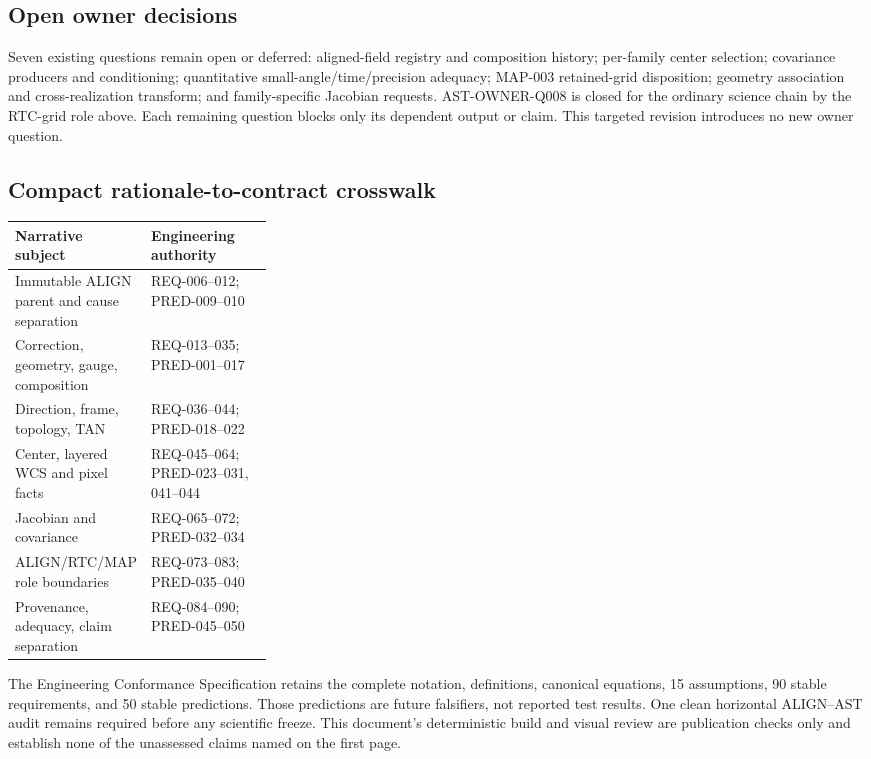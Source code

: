 \documentclass[10pt]{article}
\begin{document}
\subsection*{Open owner decisions}
Seven existing questions remain open or deferred: aligned-field registry and
composition history; per-family center selection; covariance producers and
conditioning; quantitative small-angle/time/precision adequacy; MAP-003
retained-grid disposition; geometry association and cross-realization
transform; and family-specific Jacobian requests. AST-OWNER-Q008 is closed for
the ordinary science chain by the RTC-grid role above. Each remaining question
blocks only its dependent output or claim. This
targeted revision introduces no new owner question.

\subsection*{Compact rationale-to-contract crosswalk}
\begin{tabularx}{\linewidth}{>{\raggedright\arraybackslash}p{0.30\linewidth}X}
\toprule
Narrative subject & Engineering authority \\
\midrule
Immutable ALIGN parent and cause separation & REQ-006--012; PRED-009--010 \\
Correction, geometry, gauge, composition & REQ-013--035; PRED-001--017 \\
Direction, frame, topology, TAN & REQ-036--044; PRED-018--022 \\
Center, layered WCS and pixel facts & REQ-045--064; PRED-023--031, 041--044 \\
Jacobian and covariance & REQ-065--072; PRED-032--034 \\
ALIGN/RTC/MAP role boundaries & REQ-073--083; PRED-035--040 \\
Provenance, adequacy, claim separation & REQ-084--090; PRED-045--050 \\
\bottomrule
\end{tabularx}

The Engineering Conformance Specification retains the complete notation,
definitions, canonical equations, 15 assumptions, 90 stable requirements, and
50 stable predictions. Those predictions are future falsifiers, not reported
test results. One clean horizontal ALIGN--AST audit remains required before
any scientific freeze. This document's deterministic build and visual review
are publication checks only and establish none of the unassessed claims named
on the first page.
\end{document}
